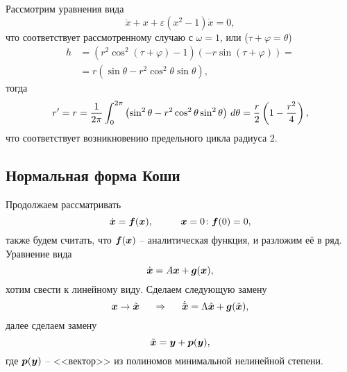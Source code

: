 Рассмотрим уравнения вида
\begin{equation*}
    \ddot{x} + x + \varepsilon (x^2 - 1) \dot{x} = 0,
\end{equation*}
что соответствует рассмотренному случаю с $\omega=1$, или ($\tau+\varphi=\theta$)
\begin{align*}
    h &= (r^2 \cos^2 (\tau + \varphi) - 1)(-r \sin (\tau  +\varphi)) = \\
    &= r (\sin \theta - r^2 \cos^2 \theta \sin \theta),
\end{align*}
тогда 
\begin{equation*}
    r' = r = \frac{1}{2\pi} \int_0^{2\pi} \left(
        \sin^2 \theta - r^2 \cos^2 \theta \sin^2 \theta
    \right) \, d \theta = \frac{r}{2}\left( 1 - \frac{r^2}{4}\right),
\end{equation*}
что соответствует возникновению предельного цикла радиуса $2$.



\subsection{Нормальная форма Коши}
Продолжаем рассматривать
\begin{equation*}
    \dot{\mbox{\boldmath $x$}} = \mbox{\boldmath $f$} (\mbox{\boldmath $x$}), \hspace{1 cm} \mbox{\boldmath $x$} =0 \colon \mbox{\boldmath $f$}(0)=0,
\end{equation*}
также будем считать, что $\mbox{\boldmath $f$}(\mbox{\boldmath $x$})$ -- аналитическая функция, и разложим её в ряд. Уравнение вида
\begin{equation*}
    \dot{\mbox{\boldmath $x$}} = A \mbox{\boldmath $x$} + \mbox{\boldmath $g$}(\mbox{\boldmath $x$}),
\end{equation*}
хотим свести к линейному виду. Сделаем следующую замену
\begin{equation*}
    \mbox{\boldmath $x$} \to \tilde{\mbox{\boldmath $x$}} 
    \hspace{0.5cm} \Rightarrow \hspace{0.5cm}
    \dot{\tilde{\mbox{\boldmath $x$}}} = \Lambda \tilde{\mbox{\boldmath $x$}} + \mbox{\boldmath $g$}(\tilde{\mbox{\boldmath $x$}}),
\end{equation*}
далее сделаем замену
\begin{equation*}
    \tilde{\mbox{\boldmath $x$}} = \mbox{\boldmath $y$} + \mbox{\boldmath $p$}(\mbox{\boldmath $y$}),
\end{equation*}
где $\mbox{\boldmath $p$}(\mbox{\boldmath $y$})$ -- <<вектор>> из полиномов минимальной нелинейной степени.

